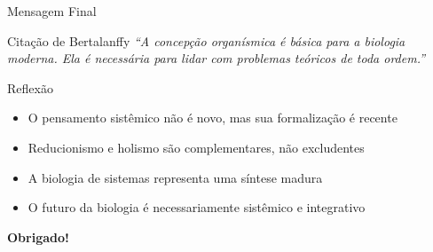 \begin{frame}[shrink=5]{Mensagem Final}
\begin{exampleblock}{Citação de Bertalanffy}
\textit{``A concepção organísmica é básica para a biologia moderna. Ela é necessária para lidar com problemas teóricos de toda ordem.''}
\end{exampleblock}

\vspace{0.5cm}

\begin{block}{Reflexão}
\begin{itemize}
    \item O pensamento sistêmico não é novo, mas sua formalização é recente
    \item Reducionismo e holismo são complementares, não excludentes
    \item A biologia de sistemas representa uma síntese madura
    \item O futuro da biologia é necessariamente sistêmico e integrativo
\end{itemize}
\end{block}

\vspace{0.3cm}

\begin{center}
\Large{\textbf{Obrigado!}}
\end{center}
\end{frame}


